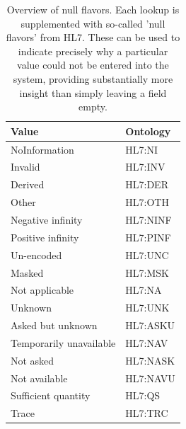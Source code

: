 \documentclass{article}
\begin{document}
\begin{table}[htb]
\begin{tabular}{ll}
Value & Ontology \\
\hline
NoInformation & HL7:NI \\
Invalid & HL7:INV \\
Derived & HL7:DER \\
Other & HL7:OTH \\
Negative infinity & HL7:NINF \\
Positive infinity & HL7:PINF \\
Un-encoded & HL7:UNC \\
Masked & HL7:MSK \\
Not applicable & HL7:NA \\
Unknown & HL7:UNK \\
Asked but unknown & HL7:ASKU \\
Temporarily unavailable & HL7:NAV \\
Not asked & HL7:NASK \\
Not available & HL7:NAVU \\
Sufficient quantity & HL7:QS \\
Trace & HL7:TRC \\
\hline
\end{tabular}
\caption[NullFlavors]{\label{table:table21} Overview of null flavors. Each lookup is supplemented with so-called 'null flavors' from HL7. These can be used to indicate precisely why a particular value could not be entered into the system, providing substantially more insight than simply leaving a field empty. }
\end{table}
\end{document}
